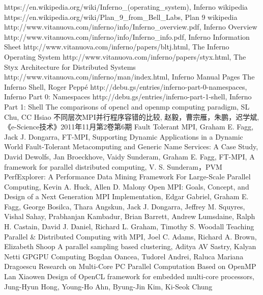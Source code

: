\documentclass[paper=a4]{ctexart} %
\numberwithin{equation}{section} %
\numberwithin{figure}{section} %
\numberwithin{table}{section} %
\begin{document}
        \begin{thebibliography}{99}
         https://en.wikipedia.org/wiki/Inferno\_(operating\_system), Inferno wikipedia
         https://en.wikipedia.org/wiki/Plan\_9\_from\_Bell\_Labs, Plan 9 wikipedia
         http://www.vitanuova.com/inferno/info/Inferno\_overview.pdf, Inferno Overview
         http://www.vitanuova.com/inferno/info/Inferno\_info.pdf, Inferno Information Sheet
         http://www.vitanuova.com/inferno/papers/bltj.html, The Inferno Operating System
         http://www.vitanuova.com/inferno/papers/styx.html, The Styx Architecture for Distributed Systems
         http://www.vitanuova.com/inferno/man/index.html, Inferno Manual Pages
         The Inferno Shell, Roger Peppé 
         http://debu.gs/entries/inferno-part-0-namespaces, Inferno Part 0: Namespaces
         http://debu.gs/entries/inferno-part-1-shell, Inferno Part 1: Shell
         The comparisons of opencl and openmp computing paradigm, SL Chu, CC Hsiao
         不同层次MPI并行程序容错的比较, 赵毅，曹宗雁，朱鹏，迟学斌, 《e-Science技术》2011年11月第2卷第6期
         Fault Tolerant MPI, Graham E. Fagg, Jack J. Dongarra, FT-MPI, Supporting Dynamic Applications in a Dynamic World
         Fault-Tolerant Metacomputing and Generic Name Services: A Case Study, David Dewolfs, Jan Broeckhove, Vaidy Sunderam, Graham E. Fagg, FT-MPI, 
         A framework for parallel distributed computing, V. S. Sunderam，PVM
         PerfExplorer: A Performance Data Mining Framework For Large-Scale Parallel Computing, Kevin A. Huck, Allen D. Malony
         Open MPI: Goals, Concept, and Design of a Next Generation MPI Implementation, Edgar Gabriel, Graham E. Fagg, George Bosilca, Thara Angskun, Jack J. Dongarra, Jeffrey M. Squyres, Vishal Sahay, Prabhanjan Kambadur, Brian Barrett, Andrew Lumsdaine, Ralph H. Castain, David J. Daniel, Richard L. Graham, Timothy S. Woodall
         Teaching Parallel \& Distributed Computing with MPI, Joel C. Adams, Richard A. Brown, Elizabeth Shoop
         A parallel sampling based clustering, Aditya AV Sastry, Kalyan Netti
         GPGPU Computing Bogdan Oancea, Tudorel Andrei, Raluca Mariana Dragoescu
         Research on Multi-Core PC Parallel Computation Based on OpenMP Lan Xiaowen  
         Design of OpenCL framework for embedded multi-core processors, Jung-Hyun Hong, Young-Ho Ahn, Byung-Jin Kim, Ki-Seok Chung
        \end{thebibliography}
      
\end{document}
